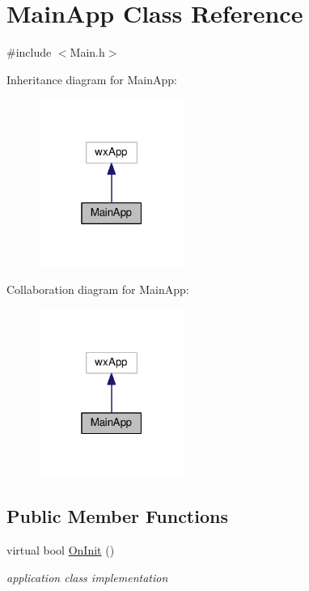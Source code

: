 \hypertarget{classMainApp}{}\section{Main\+App Class Reference}
\label{classMainApp}


{\ttfamily \#include $<$Main.\+h$>$}



Inheritance diagram for Main\+App\+:
\nopagebreak
\begin{figure}[H]
\begin{center}
\leavevmode
\includegraphics[width=135pt]{classMainApp__inherit__graph}
\end{center}
\end{figure}


Collaboration diagram for Main\+App\+:
\nopagebreak
\begin{figure}[H]
\begin{center}
\leavevmode
\includegraphics[width=135pt]{classMainApp__coll__graph}
\end{center}
\end{figure}
\subsection*{Public Member Functions}
\begin{DoxyCompactItemize}
\item 
virtual bool \hyperlink{classMainApp_aff3d398e1b61f1016c37d57798f86731}{On\+Init} ()
\begin{DoxyCompactList}\small\item\em application class implementation \end{DoxyCompactList}\end{DoxyCompactItemize}


